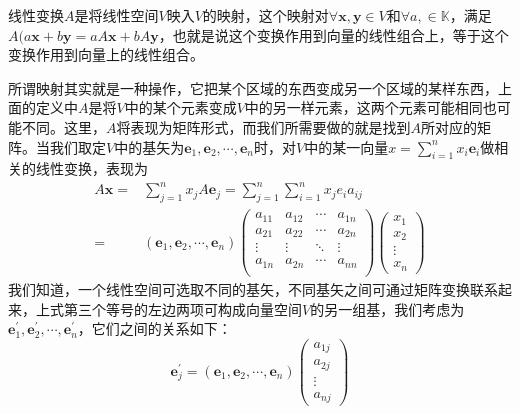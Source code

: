\begin{definition}
	线性变换$A$是将线性空间$V$映入$V$的映射，这个映射对$\forall \bm{x}, \bm{y} \in V$和$\forall a, \in \mathbb{K}$，满足$A(a\bm{x} + b\bm{y} = aA\bm{x} + bA\bm{y}$，也就是说这个变换作用到向量的线性组合上，等于这个变换作用到向量上的线性组合。
\end{definition}
所谓映射其实就是一种操作，它把某个区域的东西变成另一个区域的某样东西，上面的定义中$A$是将$V$中的某个元素变成$V$中的另一样元素，这两个元素可能相同也可能不同。这里，$A$将表现为矩阵形式，而我们所需要做的就是找到$A$所对应的矩阵。当我们取定$V$中的基矢为$\bm{e}_1, \bm{e}_2, \cdots, \bm{e}_n$时，对$V$中的某一向量$x=\sum_{i=1}^{n}x_i\bm{e}_i$做相关的线性变换，表现为
\begin{equation}
	\begin{aligned}
		A\bm{x} =& \sum_{j=1}^{n} x_j A \bm{e}_j = \sum_{j=1}^{n}\sum_{i=1}^{n} x_j e_i a_{ij}	\\
				=& (\bm{e}_1, \bm{e}_2, \cdots, \bm{e}_n)
					\begin{pmatrix}
						a_{11}	&	a_{12}	&	\cdots	&	a_{1n}	\\
						a_{21}	&	a_{22}	&	\cdots	&	a_{2n}	\\
						\vdots	&	\vdots	&	\ddots	&	\vdots	\\
						a_{1n}	&	a_{2n}	&	\cdots	&	a_{nn}	\\
					\end{pmatrix}
					\begin{pmatrix}
						x_1	\\
						x_2	\\
						\vdots	\\
						x_n
					\end{pmatrix}	\label{eq:group_basis_change}
	\end{aligned}
\end{equation}
我们知道，一个线性空间可选取不同的基矢，不同基矢之间可通过矩阵变换联系起来，上式第三个等号的左边两项可构成向量空间$V$的另一组基，我们考虑为$\bm{e}^{\prime}_1, \bm{e}^{\prime}_2, \cdots, \bm{e}^{\prime}_n$，它们之间的关系如下：
\begin{equation}
	\bm{e}^{\prime}_{j} = (\bm{e}_1, \bm{e}_2, \cdots, \bm{e}_n) 
						\begin{pmatrix}
							a_{1j}	\\
							a_{2j}	\\
							\vdots	\\
							a_{nj}
						\end{pmatrix}
\end{equation} 
